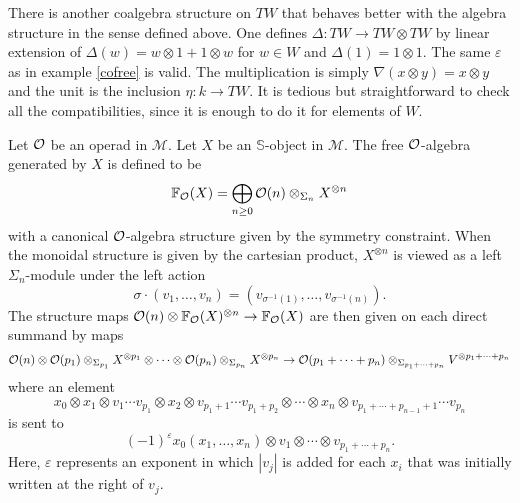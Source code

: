 \documentclass[TFM.tex]{subfiles}
\begin{document}
\begin{ex}
There is another coalgebra structure on $TW$ that behaves better with the algebra structure in the sense defined above. One defines $\Delta:TW\to TW\otimes TW$ by linear extension of $\Delta(w)=w\otimes 1+1\otimes w$ for $w\in W$ and $\Delta(1)=1\otimes 1$. The same $\varepsilon$ as in example \ref{cofree} is valid. The multiplication is simply $\nabla(x\otimes y)=x\otimes y$ and the unit is the inclusion $\eta:k\to TW$. It is tedious but straightforward to check all the compatibilities, since it is enough to do it for elements of $W$. 
\end{ex}





%
%


\begin{defi}
Let ${\mathcal O}$ be an operad in $\mathscr{M}$. Let $X$ be an $\mathbb{S}$-object in $\mathscr{M}$. The free ${\mathcal O}$-algebra generated by $X$ is defined to be
\[
\mathbb{F}_{\mathcal O}(X)=\bigoplus_{n\geq 0}{\mathcal O}(n)\otimes_{\Sigma_n}X^{\otimes n}
\]
with a canonical ${\mathcal O}$-algebra structure given by the symmetry constraint. When the monoidal structure is given by the cartesian product, $X^{\otimes n}$ is viewed as a left $\Sigma_n$-module under the left action 
\[
\sigma\cdot(v_1,\dots, v_n)=(v_{\sigma^{-1}(1)},\dots,v_{\sigma^{-1}(n)}).
\]
The structure maps ${\mathcal O}(n)\otimes\mathbb{F}_{\mathcal O}(X)^{\otimes n}\to \mathbb{F}_{\mathcal O}(X)$ are then given on each direct summand  by maps
\[
{\mathcal O}(n)\otimes{\mathcal O}(p_1)\otimes_{\Sigma_{p_1}} X^{\otimes p_1}\otimes\cdots\otimes {\mathcal O}(p_n)\otimes_{\Sigma_{p_n}} X^{\otimes p_n}\to {\mathcal O}(p_1+\cdots+p_n)\otimes_{\Sigma_{p_1+\cdots+p_n}}V^{\otimes p_1+\cdots+p_n}
\]
where an element $$x_0\otimes x_1\otimes v_1\cdots v_{p_1}\otimes x_2\otimes v_{p_1+1}\cdots v_{p_1+p_2}\otimes \cdots\otimes x_n\otimes v_{p_1+\cdots+p_{n-1}+1}\cdots v_{p_n}$$ is sent to $$(-1)^{\varepsilon} x_0(x_1,\dots, x_n)\otimes v_1\otimes\cdots\otimes v_{p_1+\cdots+p_n}.$$ Here, $\varepsilon$ represents an exponent in which $|v_j|$ is added for each $x_i$ that was initially written at the right of $v_j$. 

\end{defi} 
\end{document}
